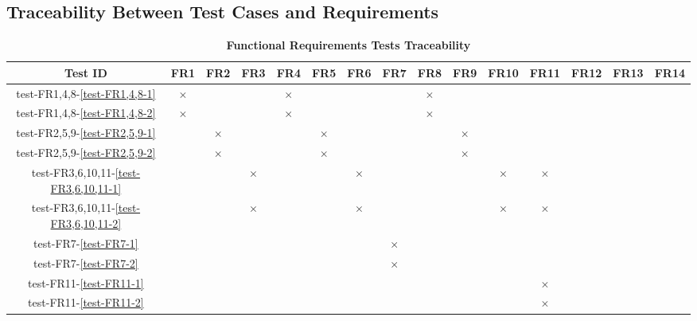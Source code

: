 \documentclass[12pt, titlepage]{article}
\begin{document}
\begin{landscape}
\subsection{Traceability Between Test Cases and Requirements} \label{section:4.4}

\begin{table}[H]
  \centering
  \begin{tabular}{|c|c|c|c|c|c|c|c|c|c|c|c|c|c|c|}
  \hline
   Test ID & FR1 & FR2 & FR3 & FR4 & FR5 & FR6 & FR7 & FR8 & FR9 & FR10 & FR11 & FR12 & FR13 & FR14\\
  \hline
  test-FR1,4,8-\ref{test-FR1,4,8-1} & $\times$ & & & $\times$ & & & & $\times$ & & & & & & \\
  \hline
  test-FR1,4,8-\ref{test-FR1,4,8-2} & $\times$ & & & $\times$ & & & & $\times$ & & & & & & \\
  \hline
  test-FR2,5,9-\ref{test-FR2,5,9-1} & & $\times$ & & & $\times$ & & & & $\times$ & & & & & \\
  \hline
  test-FR2,5,9-\ref{test-FR2,5,9-2} & & $\times$ & & & $\times$ & & & & $\times$ & & & & & \\
  \hline
  test-FR3,6,10,11-\ref{test-FR3,6,10,11-1} & & & $\times$ & & & $\times$ & & & & $\times$ & $\times$ & & & \\
  \hline
  test-FR3,6,10,11-\ref{test-FR3,6,10,11-2} & & & $\times$ & & & $\times$ & & & & $\times$ & $\times$ & & & \\
  \hline
  test-FR7-\ref{test-FR7-1} & & & & & & & $\times$ & & & & & & & \\
  \hline
  test-FR7-\ref{test-FR7-2} & & & & & & & $\times$ & & & & & & & \\
  \hline
  test-FR11-\ref{test-FR11-1} & & & & & & & & & & & $\times$ & & & \\
  \hline
  test-FR11-\ref{test-FR11-2} & & & & & & & & & & & $\times$ & & & \\
  \hline
\end{tabular}
\caption{\bf Functional Requirements Tests Traceability} \label{tab:fr-test-traceability}
\end{table}



\end{landscape}
\end{document}
